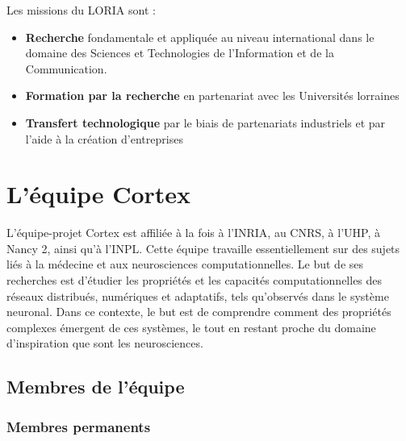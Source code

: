 Les missions du LORIA sont :
\begin{itemize}
   \item \textbf{Recherche} fondamentale et appliquée au niveau international dans le domaine des Sciences et
      Technologies de l'Information et de la Communication.
   \item \textbf{Formation par la recherche} en partenariat avec les Universités lorraines
   \item \textbf{Transfert technologique} par le biais de partenariats industriels et par l'aide à la création
      d'entreprises
\end{itemize}


\section{L'équipe Cortex} %
\label{sec:Cortex}

L'équipe-projet Cortex est affiliée à la fois à l'INRIA, au CNRS, à l'UHP, à Nancy 2,
ainsi qu'à l'INPL. Cette équipe travaille essentiellement sur des sujets liés à la médecine et aux neurosciences
computationnelles.
Le but de ses recherches est d'étudier les propriétés et les capacités computationnelles des réseaux distribués,
numériques et adaptatifs, tels qu'observés dans le système neuronal. Dans ce contexte, le but est de
comprendre comment des propriétés complexes émergent de ces systèmes, le tout en restant proche du domaine
d'inspiration que sont les neurosciences. 

\subsection{Membres de l'équipe} %
\label{sub:Membres de l'équipe}

\subsubsection{Membres permanents} %
\label{ssub:Membres permanents}

